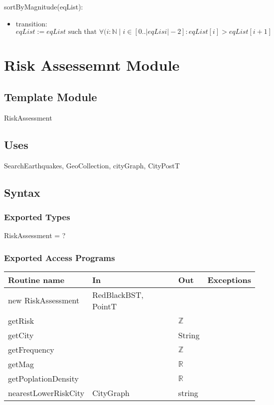 \documentclass[12pt]{article}
\begin{document}
\noindent sortByMagnitude(eqList):
\begin{itemize}
\item transition: $\mathit{eqList} := eqList  
\mbox{ such that } \forall (i : \mathbb{N} \;|\; i \in [0..|eqLisi| - 2] :eqList[i] > eqList[i + 1]$
\end{itemize}






\newpage

\section* { Risk Assessemnt Module}

\subsection* {Template Module}

RiskAssessment

\subsection* {Uses}

SearchEarthquakes, GeoCollection, cityGraph, CityPostT

\subsection* {Syntax}

\subsubsection* {Exported Types}

RiskAssessment = ?


\subsubsection* {Exported Access Programs}

\begin{tabular}{| l | l | l | p{6cm} |}
\hline
\textbf{Routine name} & \textbf{In} & \textbf{Out} & \textbf{Exceptions}\\
\hline
new RiskAssessment & RedBlackBST, PointT &  & \\
\hline
getRisk &  & $\mathbb{Z}$ & \\
\hline
getCity &  & String& \\
\hline
getFrequency &  & $\mathbb{Z}$ & \\
\hline
getMag &  & $\mathbb{R}$ & \\
\hline
getPoplationDensity &  & $\mathbb{R}$ & \\
\hline
nearestLowerRiskCity & CityGraph & string & \\
\hline
\end{tabular}
\end{document}
